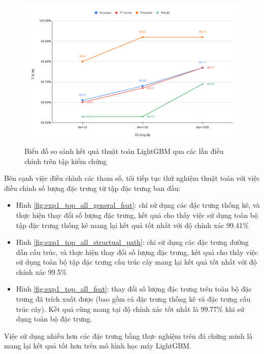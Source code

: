 \documentclass[./../main.tex]{subfiles}
\begin{document}
\begin{figure}[H]
	\centering
	\includegraphics[width=\linewidth]{./images/exp1_trials.png}
	\caption{Biểu đồ so sánh kết quả thuật toán LightGBM qua các lần điều chỉnh trên tập kiểm chứng}
	\label{fig:exp1_trials}
\end{figure}


Bên cạnh việc điều chỉnh các tham số, tôi tiếp tục thử nghiệm thuật toán với việc điều chỉnh số lượng đặc trưng từ tập đặc trưng ban đầu:

\begin{itemize}
	\item
	      Hình \ref{fig:exp1_top_all_general_feat}: chỉ sử dụng các đặc trưng thống kê, và thực hiện thay đổi số lượng đặc trưng, kết quả cho thấy việc sử dụng toàn bộ tập đặc trưng thống kê mang lại kết quả tốt nhất với độ chính xác 99.41\%
	\item
	      Hình \ref{fig:exp1_top_all_structual_path}: chỉ sử dụng các đặc trưng đường dẫn cấu trúc, và thực hiện thay đổi số lượng đặc trưng, kết quả cho thấy việc sử dụng toàn bộ tập đặc trưng cấu trúc cây mang lại kết quả tốt nhất với độ chính xác 99.5\%
	\item
	      Hình \ref{fig:exp1_top_all_feat}: thay đổi số lượng đặc trưng trên toàn bộ đặc trưng đã trích xuất được (bao gồm cả đặc trưng thống kê và đặc trưng cấu trúc cây). Kết quả cũng mang tại độ chính xác tốt nhất là 99.77\% khi sử dụng toàn bộ đặc trưng.
\end{itemize}

Việc sử dụng nhiều hơn các đặc trưng bằng thực nghiệm trên đã chứng minh là mang lại kết quả tốt hơn trên mô hình học máy LightGBM.
\end{document}
